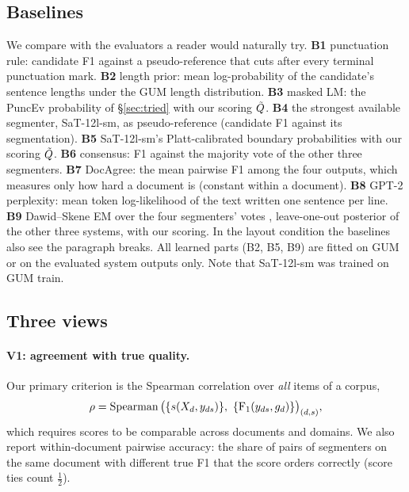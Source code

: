 \subsection{Baselines}
\label{sec:baselines}
We compare with the evaluators a reader would naturally try. \textbf{B1} punctuation rule: candidate F1 against a
pseudo-reference that cuts after every terminal punctuation mark. \textbf{B2} length prior: mean log-probability of the
candidate's sentence lengths under the GUM length distribution. \textbf{B3} masked LM: the PuncEv probability of
\S\ref{sec:tried} with our scoring $\tilde{Q}$. \textbf{B4} the strongest available segmenter, SaT-12l-sm, as
pseudo-reference (candidate F1 against its segmentation). \textbf{B5} SaT-12l-sm's Platt-calibrated
\citep{platt-1999-probabilistic} boundary probabilities with our scoring $\tilde{Q}$. \textbf{B6} consensus: F1 against the
majority vote of the other three segmenters. \textbf{B7} DocAgree: the mean pairwise F1 among the four outputs, which
measures only how hard a document is (constant within a document). \textbf{B8} GPT-2 \citep{radford-etal-2019-language}
perplexity: mean token log-likelihood of the text written one sentence per line. \textbf{B9} Dawid--Skene EM over the four
segmenters' votes \citep{dawid-skene-1979-maximum}, leave-one-out posterior of the other three systems, with our scoring.
In the layout condition the baselines also see the paragraph breaks. All learned parts (B2, B5, B9) are fitted on GUM
or on the evaluated system outputs only. Note that SaT-12l-sm was trained on GUM train.

\subsection{Three views}
\label{sec:views}
\paragraph{V1: agreement with true quality.} Our primary criterion is the Spearman correlation over \emph{all} items
of a corpus,
\begin{equation}
  \rho = \operatorname{Spearman}\big(\{s(X_d, y_{ds})\},\ \{\mathrm{F}_1(y_{ds}, g_d)\}\big)_{(d,s)},
  \label{eq:rho}
\end{equation}
which requires scores to be comparable across documents and domains. We also report within-document pairwise accuracy:
the share of pairs of segmenters on the same document with different true F1 that the score orders correctly (score ties
count $\frac12$).

